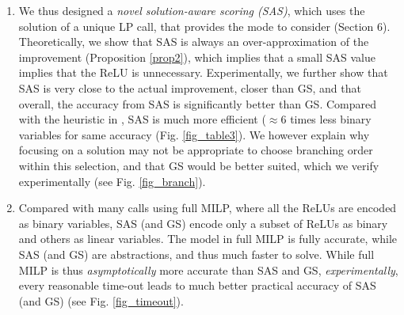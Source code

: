 \begin{enumerate}
	\item We thus designed a {\em novel solution-aware scoring ({\sf SAS})}, which uses the solution of a unique LP call, that provides the mode to consider (Section 6). Theoretically, we show that {\sf SAS} is always an over-approximation of the improvement (Proposition \ref{prop2}), which implies that a small {\sf SAS} value implies that the ReLU is unnecessary. Experimentally, we further show that {\sf SAS} is very close to the actual improvement, closer than {\sf GS}, and that overall, the accuracy from SAS is significantly better than {\sf GS}.  Compared with the heuristic in \cite{DivideAndSlide},  {\sf SAS} is much more efficient ($\approx 6$ times less binary variables for same accuracy (Fig. \ref{fig_table3}). We however explain why focusing on a solution may not be appropriate to choose branching order within this selection, and that GS would be better suited, which we verify experimentally ({\color{red}see Fig. \ref{fig_branch}}).
	
	\item Compared with many calls using full MILP, where all the ReLUs are encoded as binary variables, {\sf SAS} (and {\sf GS}) encode only a subset of ReLUs as binary and others as linear variables. The model in full MILP is fully accurate, while {\sf SAS} (and {\sf GS})
	are abstractions, and thus much faster to solve. 
	While full MILP is thus {\em asymptotically} more accurate than {\sf SAS} and {\sf GS}, {\em experimentally}, every reasonable time-out leads to much better practical accuracy of {\sf SAS} (and {\sf GS}) ({\color{red}see Fig. \ref{fig_timeout}}).

	

\end{enumerate}
